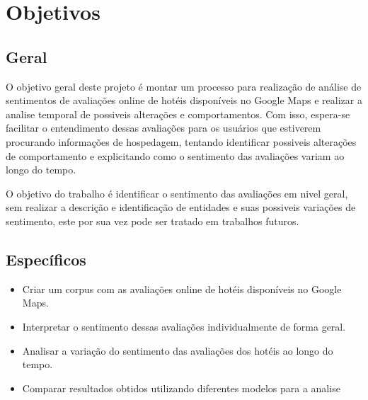 \section{Objetivos}

\subsection{Geral}

O objetivo geral deste projeto é montar um processo para realização de análise de sentimentos de avaliações online de hotéis disponíveis no Google Maps e realizar a analise temporal de possiveis alterações e comportamentos. Com isso, espera-se facilitar o entendimento dessas avaliações para os usuários que estiverem procurando informações de hospedagem, tentando identificar possiveis alterações de comportamento e explicitando como o sentimento das avaliações variam ao longo do tempo.

O objetivo do trabalho é identificar o sentimento das avaliações em nivel geral, sem realizar a descrição e identificação de entidades e suas possiveis variações de sentimento, este por sua vez pode ser tratado em trabalhos futuros.

\subsection{Específicos}

\begin{itemize}
	\item Criar um corpus com as avaliações online de hotéis disponíveis no Google Maps.
	\item Interpretar o sentimento dessas avaliações individualmente de forma geral.
	\item Analisar a variação do sentimento das avaliações dos hotéis ao longo do tempo.
	\item Comparar resultados obtidos utilizando diferentes modelos para a analise
\end{itemize}
